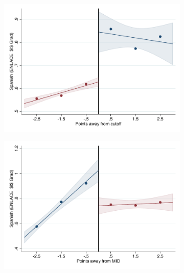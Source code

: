 \documentclass[oneside,11pt]{article}
\begin{document}
\begin{figure}[H]

    \ContinuedFloat
    \caption{(Cont.) RD plots for outcome variables across those assigned to UNAM high-school, and those who are not\label{fig:ITT_rd_plot_UNAM_2}}
    \begin{center}
    
    \begin{subfigure}{0.475\textwidth}
        \centering
        \includegraphics[width=\textwidth]{04_Figures/rd_plot_tau_p_esp_3_UNAM3.pdf}
    \end{subfigure}
    \begin{subfigure}{0.475\textwidth}
        \centering
        \includegraphics[width=\textwidth]{04_Figures/rd_plot_mid_p_esp_3_UNAM3.pdf}
    \end{subfigure}


\end{center}
\end{figure}
\end{document}
